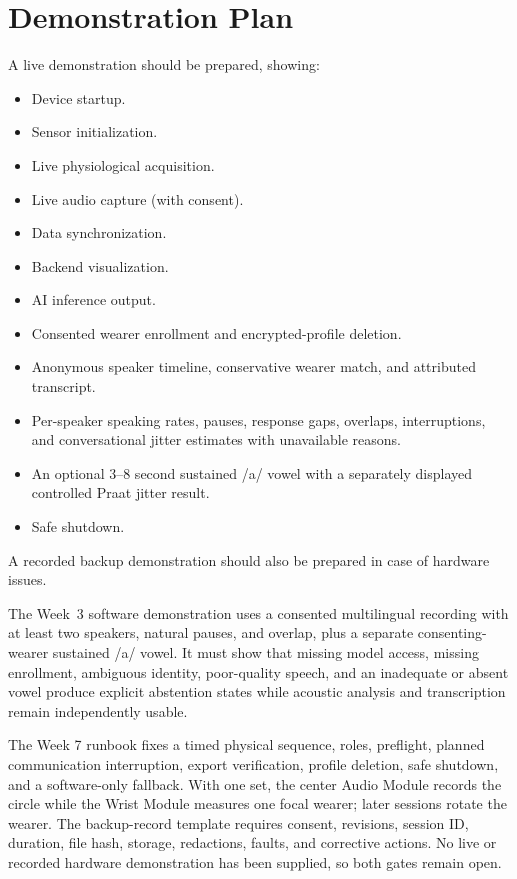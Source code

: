 \section{Demonstration Plan}
\label{sec:demonstration-plan}

A live demonstration should be prepared, showing:
\begin{itemize}
    \item Device startup.
    \item Sensor initialization.
    \item Live physiological acquisition.
    \item Live audio capture (with consent).
    \item Data synchronization.
    \item Backend visualization.
    \item AI inference output.
    \item Consented wearer enrollment and encrypted-profile deletion.
    \item Anonymous speaker timeline, conservative wearer match, and attributed transcript.
    \item Per-speaker speaking rates, pauses, response gaps, overlaps, interruptions, and conversational jitter estimates with unavailable reasons.
    \item An optional 3--8 second sustained /a/ vowel with a separately displayed controlled Praat jitter result.
    \item Safe shutdown.
\end{itemize}

\begin{requirementbox}
A recorded backup demonstration should also be prepared in case of hardware issues.
\end{requirementbox}

The Week~3 software demonstration uses a consented multilingual recording with at least two speakers, natural pauses, and overlap, plus a separate consenting-wearer sustained /a/ vowel. It must show that missing model access, missing enrollment, ambiguous identity, poor-quality speech, and an inadequate or absent vowel produce explicit abstention states while acoustic analysis and transcription remain independently usable.

The Week 7 runbook fixes a timed physical sequence, roles, preflight, planned communication interruption, export verification, profile deletion, safe shutdown, and a software-only fallback. With one set, the center Audio Module records the circle while the Wrist Module measures one focal wearer; later sessions rotate the wearer. The backup-record template requires consent, revisions, session ID, duration, file hash, storage, redactions, faults, and corrective actions. No live or recorded hardware demonstration has been supplied, so both gates remain open.
